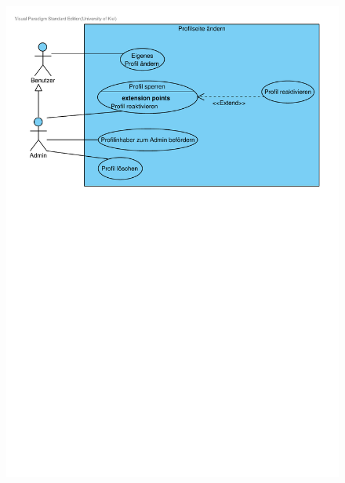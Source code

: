 \documentclass[10pt,a4paper]{article}
\begin{document}
	\begin{figure}[h]
		\includegraphics[width=\linewidth]{gfx/webseite/Profilseite.pdf}
	\end{figure}
\end{document}
